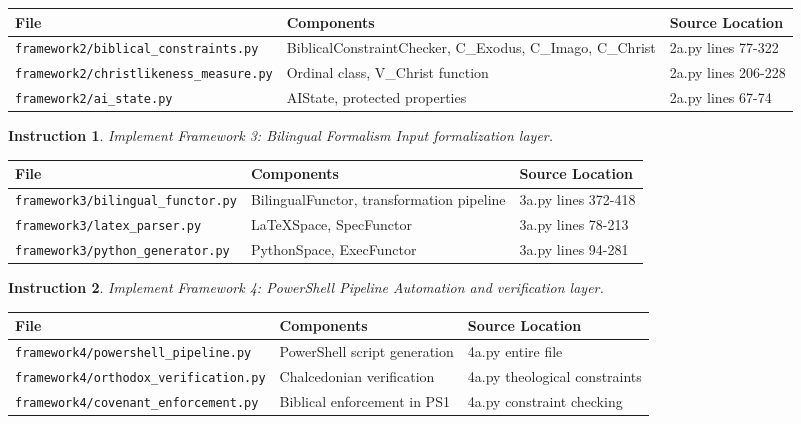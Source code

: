 \documentclass[12pt]{article}
\newtheorem{instruction}{Instruction}
\begin{document}
\begin{longtable}{|p{}|p{}|p{}|}
\hline
\textbf{File} & \textbf{Components} & \textbf{Source Location} \\
\hline
\texttt{framework2/biblical\_constraints.py} & BiblicalConstraintChecker, C\_Exodus, C\_Imago, C\_Christ & 2a.py lines 77-322 \\
\hline
\texttt{framework2/christlikeness\_measure.py} & Ordinal class, V\_Christ function & 2a.py lines 206-228 \\
\hline
\texttt{framework2/ai\_state.py} & AIState, protected properties & 2a.py lines 67-74 \\
\hline
\end{longtable}

\begin{instruction}{Implement Framework 3: Bilingual Formalism}
Input formalization layer.
\end{instruction}

\begin{longtable}{|p{}|p{}|p{}|}
\hline
\textbf{File} & \textbf{Components} & \textbf{Source Location} \\
\hline
\texttt{framework3/bilingual\_functor.py} & BilingualFunctor, transformation pipeline & 3a.py lines 372-418 \\
\hline
\texttt{framework3/latex\_parser.py} & LaTeXSpace, SpecFunctor & 3a.py lines 78-213 \\
\hline
\texttt{framework3/python\_generator.py} & PythonSpace, ExecFunctor & 3a.py lines 94-281 \\
\hline
\end{longtable}

\begin{instruction}{Implement Framework 4: PowerShell Pipeline}
Automation and verification layer.
\end{instruction}

\begin{longtable}{|p{}|p{}|p{}|}
\hline
\textbf{File} & \textbf{Components} & \textbf{Source Location} \\
\hline
\texttt{framework4/powershell\_pipeline.py} & PowerShell script generation & 4a.py entire file \\
\hline
\texttt{framework4/orthodox\_verification.py} & Chalcedonian verification & 4a.py theological constraints \\
\hline
\texttt{framework4/covenant\_enforcement.py} & Biblical enforcement in PS1 & 4a.py constraint checking \\
\hline
\end{longtable}
\end{document}

